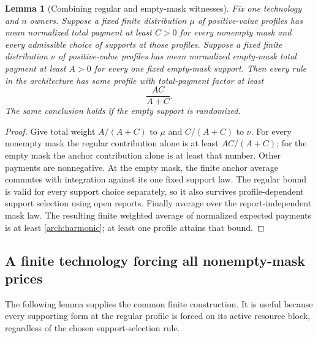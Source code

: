 \documentclass[11pt]{article}
\newtheorem{lemma}[theorem]{Lemma}
\theoremstyle{definition}\newtheorem{definition}[theorem]{Definition}
\theoremstyle{remark}\newtheorem{remark}[theorem]{Remark}
\begin{document}
\begin{lemma}[Combining regular and empty-mask witnesses]
\label{arch:averaging}
Fix one technology and $n$ owners. Suppose a fixed finite distribution
$\mu$ of positive-value profiles has mean normalized total payment at least
$C>0$ for every nonempty mask and every admissible choice of supports at
those profiles. Suppose a fixed finite distribution $\nu$ of positive-value
profiles has mean normalized empty-mask total payment at least $A>0$ for
every one fixed empty-mask support. Then every rule in the architecture has
some profile with total-payment factor at least
\begin{equation}\label{arch:harmonic}
 \frac{AC}{A+C}.
\end{equation}
The same conclusion holds if the empty support is randomized.
\end{lemma}
\begin{proof}
Give total weight $A/(A+C)$ to $\mu$ and $C/(A+C)$ to $\nu$.
For every nonempty mask the regular contribution alone is at least
$AC/(A+C)$; for the empty mask the anchor contribution alone is at least
that number. Other payments are nonnegative. At the empty mask, the finite
anchor average commutes with integration against its one fixed support law.
The regular bound is valid for every support choice separately, so it also
survives profile-dependent support selection using open reports. Finally
average over the report-independent mask law. The resulting finite weighted
average of normalized expected payments is at least \eqref{arch:harmonic};
at least one profile attains that bound.
\end{proof}

\subsection{A finite technology forcing all nonempty-mask prices}

The following lemma supplies the common finite construction. It is useful
because every supporting form at the regular profile is forced on its active
resource block, regardless of the chosen support-selection rule.
\end{document}
